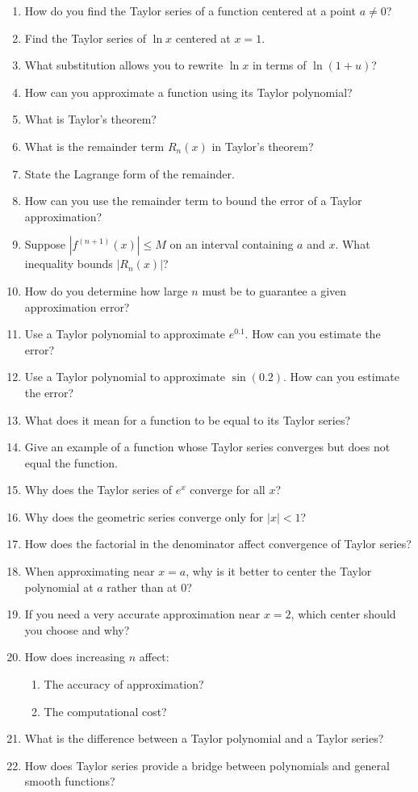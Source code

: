 \begin{enumerate}
  \item How do you find the Taylor series of a function centered at a point $a \neq 0$?
  \item Find the Taylor series of $\ln x$ centered at $x=1$.
  \item What substitution allows you to rewrite $\ln x$ in terms of $\ln(1+u)$?
  \item How can you approximate a function using its Taylor polynomial?
  \item What is Taylor's theorem?
  \item What is the remainder term $R_n(x)$ in Taylor's theorem?
  \item State the Lagrange form of the remainder.
  \item How can you use the remainder term to bound the error of a Taylor approximation?
  \item Suppose $|f^{(n+1)}(x)| \le M$ on an interval containing $a$ and $x$. What inequality bounds $|R_n(x)|$?
  \item How do you determine how large $n$ must be to guarantee a given approximation error?
  \item Use a Taylor polynomial to approximate $e^{0.1}$. How can you estimate the error?
  \item Use a Taylor polynomial to approximate $\sin(0.2)$. How can you estimate the error?
  \item What does it mean for a function to be equal to its Taylor series?
  \item Give an example of a function whose Taylor series converges but does not equal the function.
  \item Why does the Taylor series of $e^x$ converge for all $x$?
  \item Why does the geometric series converge only for $|x|<1$?
  \item How does the factorial in the denominator affect convergence of Taylor series?
  \item When approximating near $x=a$, why is it better to center the Taylor polynomial at $a$ rather than at $0$?
  \item If you need a very accurate approximation near $x=2$, which center should you choose and why?
  \item How does increasing $n$ affect:
    \begin{enumerate}
      \item The accuracy of approximation?
      \item The computational cost?
    \end{enumerate}
  \item What is the difference between a Taylor polynomial and a Taylor series?
  \item How does Taylor series provide a bridge between polynomials and general smooth functions?
\end{enumerate}
